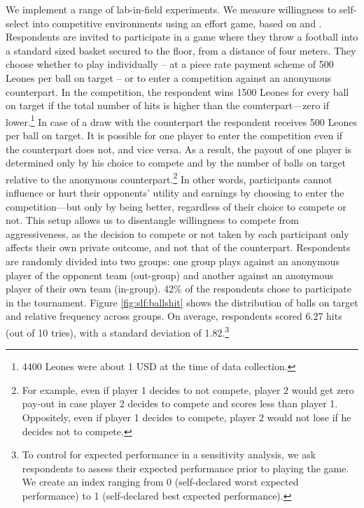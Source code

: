 We implement a range of lab-in-field experiments. We measure willingness to self-select into competitive environments using an effort game, based on \cite{Niederle2007} and \cite{Bartling2009b}. Respondents are invited to participate in a game where they throw a football into a standard sized basket secured to the floor, from a distance of four meters. They choose whether to play individually – at a piece rate payment scheme of 500 Leones per ball on target – or to enter a competition against an anonymous counterpart. In the competition, the respondent wins 1500 Leones for every ball on target if the total number of hits is higher than the counterpart––zero if lower.\footnote{4400 Leones were about 1 USD at the time of data collection.}   In case of a draw with the counterpart the respondent receives 500 Leones per ball on target. It is possible for one player to enter the competition even if the counterpart does not, and vice versa. As a result, the payout of one player is determined only by his choice to compete and by the number of balls on target relative to the anonymous counterpart.\footnote{For example, even if player 1 decides to not compete, player 2 would get zero pay-out in case player 2 decides to compete and scores less than player 1. Oppositely, even if player 1 decides to compete, player 2 would not lose if he decides not to compete.}  In other words, participants cannot influence or hurt their opponents’ utility and earnings by choosing to enter the competition—but only by being better, regardless of their choice to compete or not. This setup allows us to disentangle willingness to compete from aggressiveness, as the decision to compete or not taken by each participant only affects their own private outcome, and not that of the counterpart. Respondents are randomly divided into two groups: one group plays against an anonymous player of the opponent team (out-group) and another against an anonymous player of their own team (in-group). 42\% of the respondents chose to participate in the tournament. Figure \ref{fig:slf:ballshit} shows the distribution of balls on target and relative frequency across groups. On average, respondents scored 6.27 hits (out of 10 tries), with a standard deviation of 1.82.\footnote{To control for expected performance in a sensitivity analysis, we ask respondents to assess their expected performance prior to playing the game. We create an index ranging from 0 (self-declared worst expected performance) to 1 (self-declared best expected performance).}  

